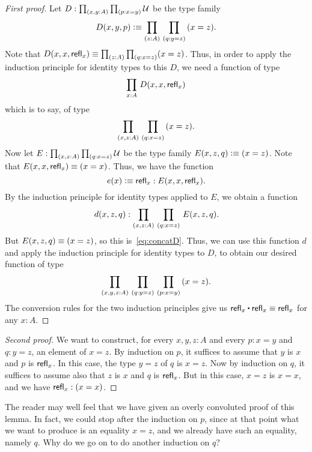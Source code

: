 \begin{proof}[First proof]
  Let $D:\prd{x,y:A}{p:x=y} \type$ be the type family
  \begin{equation*}
    D(x,y,p)\defeq \prd{z:A}{q:y=z} (x=z).
  \end{equation*}
  Note that $D(x,x,\refl x) \jdeq \prd{z:A}{q:x=z} (x=z)$.
  Thus, in order to apply the induction principle for identity types to this $D$, we need a function of type
  \begin{equation}\label{eq:concatD}
    \prd{x:A} D(x,x,\refl{x})
  \end{equation}
  which is to say, of type
  \[ \prd{x,z:A}{q:x=z} (x=z). \]
  Now let $E:\prd{x,z:A}{q:x=z}\type$ be the type family $E(x,z,q)\vcentcolon\equiv (x=z)$.
  Note that $E(x,x,\mathsf{refl}_{x}) \equiv (x=x)$.
  Thus, we have the function
  \begin{equation*}
    e(x) \vcentcolon\equiv \mathsf{refl}_{x} : E(x,x,\mathsf{refl}_{x}).
  \end{equation*}
  By the induction principle for identity types applied to $E$, we obtain a function
  \begin{equation*}
    d(x,z,q) : \prd{x,z:A}{q:x=z} E(x,z,q).
  \end{equation*}
  But $E(x,z,q)\equiv (x=z)$, so this is~\eqref{eq:concatD}.
  Thus, we can use this function $d$ and apply the induction principle for identity types to $D$, to obtain our desired function of type
  \begin{equation*}
    \prd{x,y,z:A}{q:y=z}{p:x=y} (x=z).
  \end{equation*}
  The conversion rules for the two induction principles give us $\refl{x}\ct \refl{x}\jdeq \refl{x}$ for any $x:A$.
\end{proof}

\begin{proof}[Second proof]
  We want to construct, for every $x,y,z:A$ and every $p:x=y$ and $q:y=z$, an element of $x=z$.
  By induction on $p$, it suffices to assume that $y$ is $x$ and $p$ is $\mathsf{refl}_{x}$.
  In this case, the type $y=z$ of $q$ is $x=z$.
  Now by induction on $q$, it suffices to assume also that $z$ is $x$ and $q$ is $\mathsf{refl}_{x}$.
  But in this case, $x=z$ is $x=x$, and we have $\mathsf{refl}_{x}:(x=x)$.
\end{proof}

The reader may well feel that we have given an overly convoluted proof of this lemma.
In fact, we could stop after the induction on $p$, since at that point what we want to produce is an equality $x=z$, and we already have such an equality, namely $q$.
Why do we go on to do another induction on $q$?

